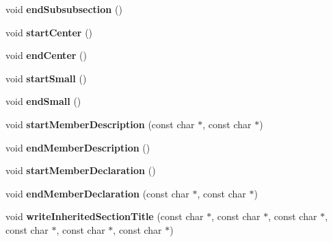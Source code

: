 \begin{DoxyCompactItemize}
\item 
\hypertarget{class_latex_generator_af3a0a92b5bad729bb6eeafb07ca54b8f}{void {\bfseries end\-Subsubsection} ()}\label{class_latex_generator_af3a0a92b5bad729bb6eeafb07ca54b8f}

\item 
\hypertarget{class_latex_generator_abdafeba989f102a3656f6b3341ddc79b}{void {\bfseries start\-Center} ()}\label{class_latex_generator_abdafeba989f102a3656f6b3341ddc79b}

\item 
\hypertarget{class_latex_generator_a3e879450d54b627a5d86065b831ca0ac}{void {\bfseries end\-Center} ()}\label{class_latex_generator_a3e879450d54b627a5d86065b831ca0ac}

\item 
\hypertarget{class_latex_generator_a3a61d98acef498d905bd2c3f070a02a1}{void {\bfseries start\-Small} ()}\label{class_latex_generator_a3a61d98acef498d905bd2c3f070a02a1}

\item 
\hypertarget{class_latex_generator_afd1e7cfc27d1c1aa0638c9c4f94ee469}{void {\bfseries end\-Small} ()}\label{class_latex_generator_afd1e7cfc27d1c1aa0638c9c4f94ee469}

\item 
\hypertarget{class_latex_generator_abc55523ac9a74887fb868ad11d0956a0}{void {\bfseries start\-Member\-Description} (const char $\ast$, const char $\ast$)}\label{class_latex_generator_abc55523ac9a74887fb868ad11d0956a0}

\item 
\hypertarget{class_latex_generator_a0dd91ddf8c2ef96803ec72c46964fdfd}{void {\bfseries end\-Member\-Description} ()}\label{class_latex_generator_a0dd91ddf8c2ef96803ec72c46964fdfd}

\item 
\hypertarget{class_latex_generator_adc7e1ef5ab7013afb090683808aec804}{void {\bfseries start\-Member\-Declaration} ()}\label{class_latex_generator_adc7e1ef5ab7013afb090683808aec804}

\item 
\hypertarget{class_latex_generator_a72e9196e0361b6a7c0388f61047141dc}{void {\bfseries end\-Member\-Declaration} (const char $\ast$, const char $\ast$)}\label{class_latex_generator_a72e9196e0361b6a7c0388f61047141dc}

\item 
\hypertarget{class_latex_generator_a78c22cc38dae09d7200a1f4d3b9a3e50}{void {\bfseries write\-Inherited\-Section\-Title} (const char $\ast$, const char $\ast$, const char $\ast$, const char $\ast$, const char $\ast$, const char $\ast$)}\label{class_latex_generator_a78c22cc38dae09d7200a1f4d3b9a3e50}


\end{DoxyCompactItemize}
